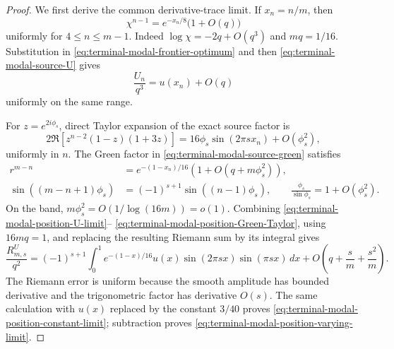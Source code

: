 \begin{proof}
We first derive the common derivative-trace limit.  If $x_n=n/m$, then
\begin{equation}
 \chi^{n-1}=e^{-x_n/8}\bigl(1+O(q)\bigr)
 \label{eq:terminal-modal-position-chi-limit}
\end{equation}
uniformly for $4\le n\le m-1$.  Indeed
$\log\chi=-2q+O(q^3)$ and $mq=1/16$.  Substitution in
\eqref{eq:terminal-modal-frontier-optimum} and then
\eqref{eq:terminal-modal-source-U} gives
\begin{equation}
 \frac{U_n}{q^3}=u(x_n)+O(q)
 \label{eq:terminal-modal-position-U-limit}
\end{equation}
uniformly on the same range.

For $z=e^{2i\phi_s}$, direct Taylor expansion of the exact source factor is
\begin{equation}
 2\Re\!\left[z^{n-2}(1-z)(1+3z)\right]
 =16\phi_s\sin(2\pi s x_n)+O(\phi_s^2),
 \label{eq:terminal-modal-position-source-Taylor}
\end{equation}
uniformly in $n$.  The Green factor in
\eqref{eq:terminal-modal-source-green} satisfies
\begin{align}
 r^{m-n}&=e^{-(1-x_n)/16}
 \left(1+O(q+m\phi_s^2)\right),
 \label{eq:terminal-modal-position-damping-Taylor}\\
 \sin((m-n+1)\phi_s)
 &=(-1)^{s+1}\sin((n-1)\phi_s),
 \qquad
 \frac{\phi_s}{\sin\phi_s}=1+O(\phi_s^2).
 \label{eq:terminal-modal-position-Green-Taylor}
\end{align}
On the band, $m\phi_s^2=O(1/\log(16m))=o(1)$.  Combining
\eqref{eq:terminal-modal-position-U-limit}--
\eqref{eq:terminal-modal-position-Green-Taylor}, using
$16mq=1$, and replacing the resulting Riemann sum by its integral gives
\begin{equation}
 \frac{R^U_{m,s}}{q^2}
 =(-1)^{s+1}\int_0^1e^{-(1-x)/16}u(x)
 \sin(2\pi sx)\sin(\pi sx)\,dx
 +O\!\left(q+\frac{s}{m}+\frac{s^2}{m}\right).
 \label{eq:terminal-modal-position-U-Riemann}
\end{equation}
The Riemann error is uniform because the smooth amplitude has bounded
derivative and the trigonometric factor has derivative $O(s)$.  The same
calculation with $u(x)$ replaced by the constant $3/40$ proves
\eqref{eq:terminal-modal-position-constant-limit}; subtraction proves
\eqref{eq:terminal-modal-position-varying-limit}.


\end{proof}
